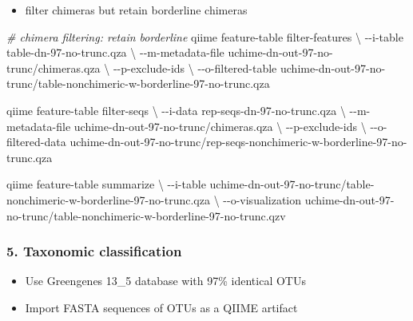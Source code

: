 \documentclass[
]{article}
\newenvironment{Shaded}{\begin{snugshade}}{\end{snugshade}}
\newcommand{\AttributeTok}[1]{\textcolor[rgb]{0.77,0.63,0.00}{#1}}
\newcommand{\CommentTok}[1]{\textcolor[rgb]{0.56,0.35,0.01}{\textit{#1}}}
\newcommand{\DataTypeTok}[1]{\textcolor[rgb]{0.13,0.29,0.53}{#1}}
\newcommand{\ExtensionTok}[1]{#1}
\newcommand{\NormalTok}[1]{#1}
\providecommand{\tightlist}{%
  \setlength{\itemsep}{0pt}\setlength{\parskip}{0pt}}
\begin{document}
\begin{itemize}
\tightlist
\item
  filter chimeras but retain borderline chimeras
\end{itemize}

\begin{Shaded}
\begin{Highlighting}[]
\CommentTok{\# chimera filtering: retain borderline}
\ExtensionTok{qiime}\NormalTok{ feature{-}table filter{-}features }\DataTypeTok{\textbackslash{}}
  \AttributeTok{{-}{-}i{-}table}\NormalTok{ table{-}dn{-}97{-}no{-}trunc.qza }\DataTypeTok{\textbackslash{}}
  \AttributeTok{{-}{-}m{-}metadata{-}file}\NormalTok{ uchime{-}dn{-}out{-}97{-}no{-}trunc/chimeras.qza }\DataTypeTok{\textbackslash{}}
  \AttributeTok{{-}{-}p{-}exclude{-}ids} \DataTypeTok{\textbackslash{}}
  \AttributeTok{{-}{-}o{-}filtered{-}table}\NormalTok{ uchime{-}dn{-}out{-}97{-}no{-}trunc/table{-}nonchimeric{-}w{-}borderline{-}97{-}no{-}trunc.qza}
  
\ExtensionTok{qiime}\NormalTok{ feature{-}table filter{-}seqs }\DataTypeTok{\textbackslash{}}
  \AttributeTok{{-}{-}i{-}data}\NormalTok{ rep{-}seqs{-}dn{-}97{-}no{-}trunc.qza }\DataTypeTok{\textbackslash{}}
  \AttributeTok{{-}{-}m{-}metadata{-}file}\NormalTok{ uchime{-}dn{-}out{-}97{-}no{-}trunc/chimeras.qza }\DataTypeTok{\textbackslash{}}
  \AttributeTok{{-}{-}p{-}exclude{-}ids} \DataTypeTok{\textbackslash{}}
  \AttributeTok{{-}{-}o{-}filtered{-}data}\NormalTok{ uchime{-}dn{-}out{-}97{-}no{-}trunc/rep{-}seqs{-}nonchimeric{-}w{-}borderline{-}97{-}no{-}trunc.qza}
  
\ExtensionTok{qiime}\NormalTok{ feature{-}table summarize }\DataTypeTok{\textbackslash{}}
  \AttributeTok{{-}{-}i{-}table}\NormalTok{ uchime{-}dn{-}out{-}97{-}no{-}trunc/table{-}nonchimeric{-}w{-}borderline{-}97{-}no{-}trunc.qza }\DataTypeTok{\textbackslash{}}
  \AttributeTok{{-}{-}o{-}visualization}\NormalTok{ uchime{-}dn{-}out{-}97{-}no{-}trunc/table{-}nonchimeric{-}w{-}borderline{-}97{-}no{-}trunc.qzv}
\end{Highlighting}
\end{Shaded}

\hypertarget{taxonomic-classification}{%
\subsubsection{5. Taxonomic
classification}\label{taxonomic-classification}}

\begin{itemize}
\tightlist
\item
  Use Greengenes 13\_5 database with 97\% identical OTUs
\item
  Import FASTA sequences of OTUs as a QIIME artifact
\end{itemize}
\end{document}
